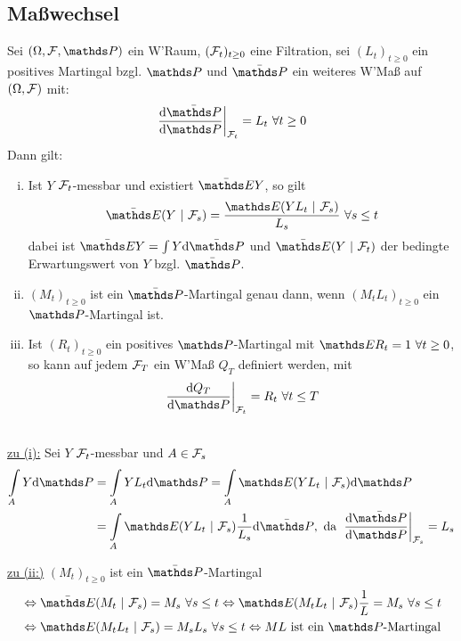 \subsection{Maßwechsel}
\label{sub:masswechsel}
Sei $(\Omega,\F,\Pw)$ ein W'Raum, $(\mathcal{F}_t)_{t\ge 0}$ eine Filtration, sei $(L_t)_{t\ge0}$ ein positives Martingal bzgl. $\Pw$ und $\bar{\Pw}$ ein weiteres W'Maß auf $(\Omega,\mathcal{F})$ mit:
\[
\left.\frac{\dint \bar{\Pw}}{\dint \Pw}\right|_{\F_t}=L_t~\forall t\ge 0
\]
Dann gilt:
\begin{enumerate}[(i)]
	\item Ist $Y$ $\mathcal{F}_t$-messbar und existiert $\bar{\E}Y$, so gilt
	\[
	\bar{\E}(Y~|~\F_s)=\frac{\E(YL_t~|~\F_s)}{L_s}~\forall s\le t
	\]
	dabei ist $\bar{\E}Y=\int Y\dint \bar{\Pw}$ und $\bar{\E}(Y~|~\F_t)$ der bedingte Erwartungswert von $Y$ bzgl. $\bar{\Pw}$.
	\item $(M_t)_{t\ge0}$ ist ein $\bar{\Pw}$-Martingal genau dann, wenn $(M_tL_t)_{t\ge0}$ ein $\Pw$-Martingal ist.
	\item Ist $(R_t)_{t\ge 0}$ ein positives $\Pw$-Martingal mit $\E R_t=1~\forall t\ge 0$, so kann auf jedem $\mathcal{F}_T$ ein W'Maß $Q_T$ definiert werden, mit
	\[
	\left.\frac{\dint Q_T}{\dint \Pw}\right|_{\F_t}=R_t~\forall t\le T
	\]
\end{enumerate}

\\
\uline{zu (i):}
Sei $Y$ $\mathcal{F}_t$-messbar und $A\in \mathcal{F}_s$
\begin{equation*}
\begin{aligned}
	\int\ablim{A}Y\dint \Pw &= \int\ablim{A}YL_t\dint\Pw = \int\ablim{A}\E(YL_t~|~\F_s)\dint\Pw\\
	&= \int\ablim{A}\E(YL_t~|~\F_s)\frac{1}{L_s}\dint\bar{\Pw}, \text{ da } \left.\frac{\dint \bar{\Pw}}{\dint \Pw}\right|_{\F_s}=L_s
\end{aligned}
\end{equation*}

\uline{zu (ii:)}
$(M_t)_{t\ge0}$ ist ein $\bar{\Pw}$-Martingal
\begin{equation*}
\begin{aligned}
	&\Leftrightarrow \bar{\E}(M_t~|~\F_s)=M_s~\forall s\le t \Leftrightarrow \E(M_tL_t~|~\F_s)\frac{1}{L}=M_s~\forall s\le t\\
	&\Leftrightarrow \E(M_tL_t~|~\F_s)=M_sL_s~\forall s\le t \Leftrightarrow ML \text{ ist ein }\Pw\text{-Martingal}
\end{aligned}
\end{equation*}

